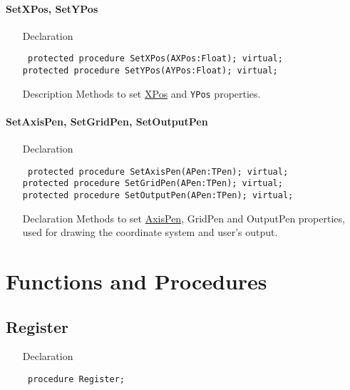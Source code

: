 \documentclass[12pt,a4paper,oneside]{report}
\newcommand{\declarationitem}[1]{{\addfontfeatures{FakeSlant} #1}}
\newcommand{\descriptiontitle}[1]{{\addfontfeatures{FakeSlant}#1}}
\newcommand{\code}[1]{\texttt{#1}}
\begin{document}
\paragraph{SetXPos, SetYPos}\hspace*{\fill}
\label{lmcoordsys.TCoordSys-SetXPos}
\begin{itemize}\item[\declarationitem{Declaration}\hfill]
	\begin{flushleft}
		\code{
			protected procedure SetXPos(AXPos:Float); virtual;\\
			protected procedure SetYPos(AYPos:Float); virtual;}
	\end{flushleft}
	\item[\descriptiontitle{Description}] Methods to set \hyperref[lmcoordsys.TCoordSys-XPos]{XPos} and \code{YPos} properties.
\end{itemize}
\paragraph{SetAxisPen, SetGridPen, SetOutputPen}\hspace*{\fill}
\label{lmcoordsys.TCoordSys-SetAxisPen}
\begin{itemize}\item[\declarationitem{Declaration}\hfill]
	\begin{flushleft}
		\code{
			protected procedure SetAxisPen(APen:TPen); virtual;\\
			protected procedure SetGridPen(APen:TPen); virtual;\\
			protected procedure SetOutputPen(APen:TPen); virtual;}
	\end{flushleft}
	\item[\declarationitem{Declaration}\hfill] Methods to set \hyperref[lmcoordsys.TCoordSys-AxisPen]{AxisPen}, GridPen and OutputPen properties, used for drawing the coordinate system and user's output.
\end{itemize}
\section{Functions and Procedures}
\subsection{Register}
\label{lmcoordsys-Register}
\begin{itemize}\item[\declarationitem{Declaration}\hfill]
\begin{flushleft}
\code{
procedure Register;}

\end{flushleft}

\end{itemize}
\end{document}
